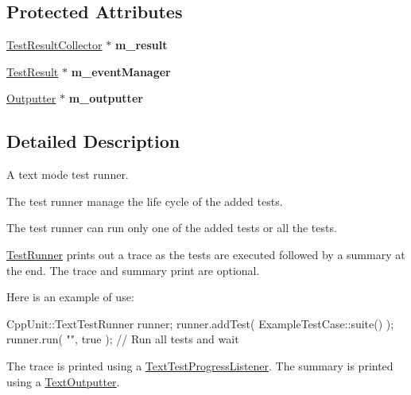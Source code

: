 \subsection*{Protected Attributes}
\begin{DoxyCompactItemize}
\item 
\hyperlink{class_test_result_collector}{Test\+Result\+Collector} $\ast$ {\bfseries m\+\_\+result}\hypertarget{class_text_test_runner_a61cf52af4ee1c64e0e8d07fe86b91ea7}{}\label{class_text_test_runner_a61cf52af4ee1c64e0e8d07fe86b91ea7}

\item 
\hyperlink{class_test_result}{Test\+Result} $\ast$ {\bfseries m\+\_\+event\+Manager}\hypertarget{class_text_test_runner_acfe13b2f69c0113670e3ba72704c0cf5}{}\label{class_text_test_runner_acfe13b2f69c0113670e3ba72704c0cf5}

\item 
\hyperlink{class_outputter}{Outputter} $\ast$ {\bfseries m\+\_\+outputter}\hypertarget{class_text_test_runner_a01e4b671a1e8a32781ef6bcb91e4e95e}{}\label{class_text_test_runner_a01e4b671a1e8a32781ef6bcb91e4e95e}

\end{DoxyCompactItemize}


\subsection{Detailed Description}
A text mode test runner.

The test runner manage the life cycle of the added tests. 

The test runner can run only one of the added tests or all the tests.

\hyperlink{class_test_runner}{Test\+Runner} prints out a trace as the tests are executed followed by a summary at the end. The trace and summary print are optional.

Here is an example of use\+:


\begin{DoxyCode}
CppUnit::TextTestRunner runner;
runner.addTest( ExampleTestCase::suite() );
runner.run( \textcolor{stringliteral}{""}, \textcolor{keyword}{true} );    \textcolor{comment}{// Run all tests and wait}
\end{DoxyCode}


The trace is printed using a \hyperlink{class_text_test_progress_listener}{Text\+Test\+Progress\+Listener}. The summary is printed using a \hyperlink{class_text_outputter}{Text\+Outputter}.

